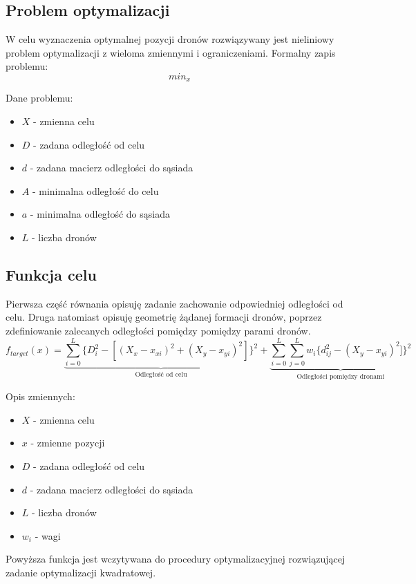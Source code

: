 \documentclass[a4paper, 11pt, oneside]{article}
\begin{document}
\subsection{Problem optymalizacji}
W celu wyznaczenia optymalnej pozycji dronów rozwiązywany jest nieliniowy problem optymalizacji z wieloma zmiennymi i ograniczeniami. Formalny zapis problemu:
\begin{equation}
min_{x}
\end{equation}


Dane problemu:
\begin{itemize}
\item $X$ - zmienna celu
\item $D$ - zadana odległość od celu
\item $d$ - zadana macierz odległości do sąsiada
\item $A$  - minimalna odległość do celu
\item $a$ -  minimalna odległość do sąsiada
\item $L$ - liczba dronów
\end{itemize}
\subsection{Funkcja celu}
Pierwsza część równania opisuję zadanie zachowanie odpowiedniej odległości od celu. Druga natomiast opisuję geometrię żądanej  formacji dronów, poprzez zdefiniowanie zalecanych odległości pomiędzy  pomiędzy parami dronów.
\begin{equation}
f_{target}(x)= \underbrace{\sum_{i=0}^{L}\lbrace D_i^2 - [(X_x -x_{xi})^2+(X_y -x_{yi})^2] \rbrace ^2}_\text{Odległość od celu} +
\underbrace{\sum_{i=0}^{L}\sum_{j=0}^{L}w_i\lbrace d_{ij}^2 -(X_y -x_{yi})^2]\rbrace ^2}_\text{Odległości pomiędzy dronami}
\end{equation}

Opis zmiennych:
\begin{itemize}
\item $X$ - zmienna celu
\item $x$ - zmienne pozycji 
\item $D$ - zadana odległość od celu
\item $d$ - zadana macierz odległości do sąsiada
\item $L$ - liczba dronów
\item $w_i$ - wagi
\end{itemize}

Powyższa funkcja jest wczytywana do procedury optymalizacyjnej rozwiązującej zadanie optymalizacji kwadratowej.
\end{document}

